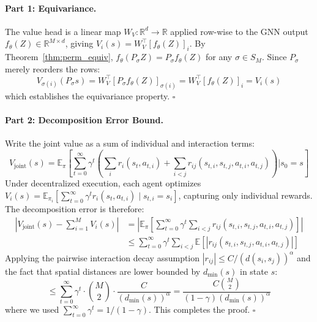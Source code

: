 \documentclass[11pt,a4paper]{article}
\begin{document}
\paragraph{Part 1: Equivariance.}
The value head is a linear map $W_V: \mathbb{R}^d \to \mathbb{R}$ applied row-wise to the GNN output $f_\theta(Z) \in \mathbb{R}^{M \times d}$, giving $V_i(s) = W_V^\top [f_\theta(Z)]_i$. By Theorem~\ref{thm:perm_equiv}, $f_\theta(P_\sigma Z) = P_\sigma f_\theta(Z)$ for any $\sigma \in S_M$. Since $P_\sigma$ merely reorders the rows:
\begin{equation}
    V_{\sigma(i)}(P_\sigma s) = W_V^\top [P_\sigma f_\theta(Z)]_{\sigma(i)} = W_V^\top [f_\theta(Z)]_i = V_i(s)
\end{equation}
which establishes the equivariance property. \hfill $\square$

\paragraph{Part 2: Decomposition Error Bound.}
Write the joint value as a sum of individual and interaction terms:
\begin{equation}
    V_{\mathrm{joint}}(s) = \mathbb{E}_\pi\left[\sum_{t=0}^{\infty} \gamma^t \left(\sum_{i} r_i(s_t, a_{t,i}) + \sum_{i<j} r_{ij}(s_{t,i}, s_{t,j}, a_{t,i}, a_{t,j})\right) \Bigg| s_0 = s\right]
\end{equation}
Under decentralized execution, each agent optimizes $V_i(s) = \mathbb{E}_{\pi_i}\left[\sum_{t=0}^{\infty} \gamma^t r_i(s_t, a_{t,i}) \mid s_{t,i} = s_i\right]$, capturing only individual rewards. The decomposition error is therefore:
\begin{align}
    \left| V_{\mathrm{joint}}(s) - \sum_{i=1}^M V_i(s) \right| &= \left| \mathbb{E}_\pi\left[\sum_{t=0}^{\infty} \gamma^t \sum_{i<j} r_{ij}(s_{t,i}, s_{t,j}, a_{t,i}, a_{t,j}) \right] \right| \\
    &\leq \sum_{t=0}^{\infty} \gamma^t \sum_{i<j} \mathbb{E}\left[|r_{ij}(s_{t,i}, s_{t,j}, a_{t,i}, a_{t,j})|\right]
\end{align}
Applying the pairwise interaction decay assumption $|r_{ij}| \leq C / (d(s_i, s_j))^\alpha$ and the fact that spatial distances are lower bounded by $d_{\min}(s)$ in state $s$:
\begin{equation}
    \leq \sum_{t=0}^{\infty} \gamma^t \cdot \binom{M}{2} \cdot \frac{C}{(d_{\min}(s))^\alpha} = \frac{C \binom{M}{2}}{(1-\gamma)(d_{\min}(s))^\alpha}
\end{equation}
where we used $\sum_{t=0}^{\infty} \gamma^t = 1/(1-\gamma)$. This completes the proof. \hfill $\square$
\end{document}

